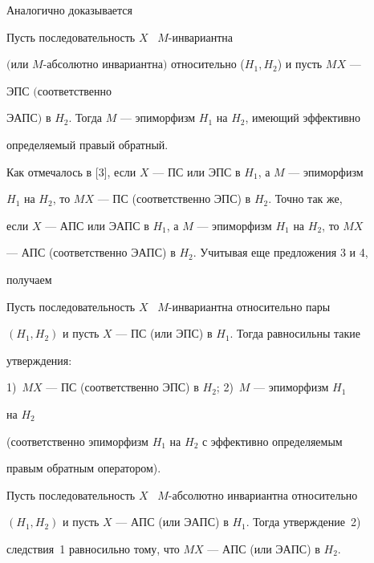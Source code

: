 Аналогично доказывается








\begin{prop}


Пусть последовательность $X$ \ $M$-инвариантна


$($или $M$-абсолютно инвариантна\/$)$ относительно ($H_1,H_2$) и пусть $MX$ ---


ЭПС $($соответственно


ЭАПС\/$)$ в $H_2$. Тогда $M$ --- эпиморфизм $H_1$ на $H_2$, имеющий эффективно


определяемый правый обратный.


\end{prop}





Как отмечалось в [3], если $X$ --- ПС или ЭПС в $H_1$, а $M$ --- эпиморфизм


$H_1$ на $H_2$, то $MX$ --- ПС (соответственно ЭПС) в $H_2$. Точно так же,


если $X$ --- АПС или ЭАПС в $H_1$, а $M$ --- эпиморфизм $H_1$ на $H_2$, то $MX$


--- АПС (соответственно ЭАПС) в $H_2$. Учитывая еще предложения 3 и 4,


получаем








\begin{cor}


Пусть последовательность $X$ \ $M$-инвариантна относительно пары


$(H_1,H_2)$ и пусть $X$ --- ПС (или ЭПС) в $H_1$. Тогда равносильны такие


утверждения:


1)~$MX$ --- ПС (соответственно ЭПС) в $H_2$; 2)~$M$ --- эпиморфизм $H_1$


на $H_2$


(соответственно эпиморфизм $H_1$ на $H_2$ с эффективно определяемым


правым обратным оператором).


\end{cor}








\begin{cor}


Пусть последовательность $X$ \ $M$-абсолютно инвариантна относительно


$(H_1,H_2)$ и пусть $X$ --- АПС (или ЭАПС) в $H_1$. Тогда утверждение~2)


следствия~1 равносильно тому, что $MX$ --- АПС (или ЭАПС) в $H_2$.


\end{cor}





